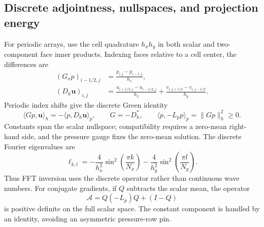 \documentclass[11pt,a4paper]{article}
\begin{document}
\subsection{Discrete adjointness, nullspaces, and projection energy}
For periodic arrays, use the cell quadrature $h_xh_y$ in both scalar and two-component face inner products. Indexing faces relative to a cell center, the differences are
\begin{align}
 (G_xp)_{i-1/2,j}&=\frac{p_{i,j}-p_{i-1,j}}{h_x},\\
 (D_h\bm u)_{i,j}&=\frac{u_{i+1/2,j}-u_{i-1/2,j}}{h_x}
 +\frac{v_{i,j+1/2}-v_{i,j-1/2}}{h_y}.
\end{align}
Periodic index shifts give the discrete Green identity
\begin{equation}
 \langle Gp,\bm u\rangle_h=-\langle p,D_h\bm u\rangle_p,
 \qquad G=-D_h^*,\qquad
 \langle p,-L_pp\rangle_p=\|Gp\|_h^2\geq0.\label{eq:green}
\end{equation}
Constants span the scalar nullspace; compatibility requires a zero-mean right-hand side, and the pressure gauge fixes the zero-mean solution. The discrete Fourier eigenvalues are
\begin{equation}
 \ell_{k,l}=-\frac{4}{h_x^2}\sin^2\!\left(\frac{\pi k}{N_x}\right)
 -\frac{4}{h_y^2}\sin^2\!\left(\frac{\pi l}{N_y}\right).\label{eq:fourier}
\end{equation}
Thus FFT inversion uses the discrete operator rather than continuous wave numbers. For conjugate gradients, if $Q$ subtracts the scalar mean, the operator
\begin{equation}
 \mathcal A=Q(-L_p)Q+(I-Q)\label{eq:spd}
\end{equation}
is positive definite on the full scalar space. The constant component is handled by an identity, avoiding an asymmetric pressure-row pin.
\end{document}
